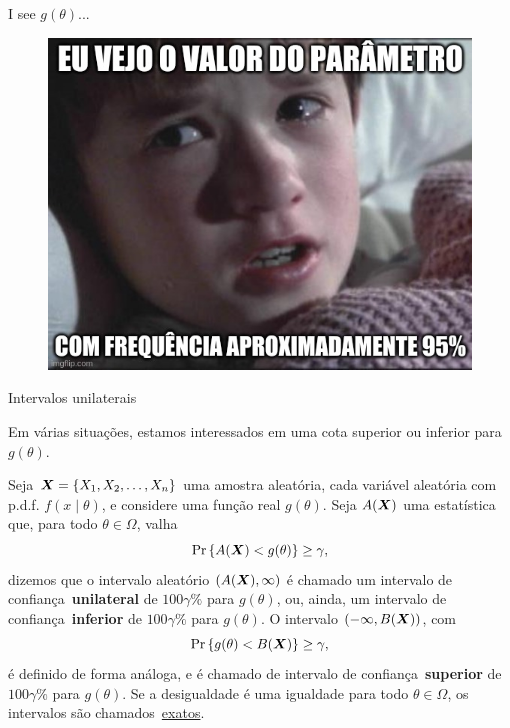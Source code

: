 \begin{frame}{I see $g(\theta)$...}

\begin{figure}[!ht]
\label{fig:freq_meme}
\begin{center}
\includegraphics[scale=0.45]{figures/freq_meme.jpg} 
\end{center} 
\end{figure} 
\end{frame}

\begin{frame}{Intervalos unilaterais}

Em várias situações, estamos interessados em uma cota superior ou inferior para $g(\theta)$.
\begin{defn}
\label{def:oneSided_CIs}
  Seja $\boldsymbol{X} = \{ X_1, X_2, \ldots, X_n \}$ uma amostra aleatória, cada variável aleatória com p.d.f. $f(x\mid \theta)$, e considere uma função real $g(\theta)$.
  Seja $A(\boldsymbol{X})$ uma estatística que, para todo $\theta \in \Omega$, valha
  \begin{equation*}
   \operatorname{Pr}\left\{A(\boldsymbol{X}) < g(\theta)\right\} \geq \gamma,
  \end{equation*}
dizemos que o intervalo aleatório $(A(\boldsymbol{X}), \infty)$ é chamado um intervalo de confiança~\textbf{unilateral} de $100\gamma\%$ para $g(\theta)$, ou, ainda, um intervalo de confiança~\textbf{inferior} de $100\gamma\%$ para $g(\theta)$.
O intervalo $(-\infty, B(\boldsymbol{X}))$, com
  \begin{equation*}
   \operatorname{Pr}\left\{g(\theta) < B(\boldsymbol{X}) \right\} \geq \gamma,
  \end{equation*}
é definido de forma análoga, e é chamado de intervalo de confiança~\textbf{superior} de $100\gamma\%$ para $g(\theta)$.
Se a desigualdade é uma igualdade para todo $\theta \in \Omega$, os intervalos são chamados~\underline{exatos}.
\end{defn}
\end{frame}

